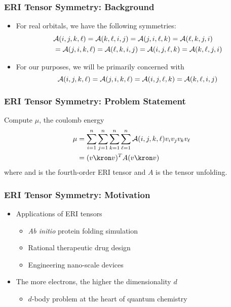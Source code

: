 \documentclass[bigger]{beamer}
\begin{document}
\begin{frame}
\frametitle{ERI Tensor Symmetry: Background}
\label{sec-1-3}
\begin{itemize}

\item For real orbitals, we have the following symmetries:
\label{sec-1-3-1}%
\begin{align*}
&{\cal A}(i,j,k,\ell) = {\cal A}(k,\ell,i,j) = {\cal A}(j,i,\ell,k) = {\cal A}(\ell,k,j,i)\\
&={\cal A}(j,i,k,\ell) = {\cal A}(\ell,k,i,j) = {\cal A}(i,j,\ell,k) = {\cal A}(k,\ell,j,i)
\end{align*}

\item For our purposes, we will be primarily concerned with
\label{sec-1-3-2}%
\begin{equation*}
{\cal A}(i,j,k,\ell) = {\cal A}(j,i,k,\ell) = {\cal A}(i,j,\ell,k) = {\cal A}(k,\ell,i,j)
\end{equation*}
\end{itemize} %
\end{frame}
\begin{frame}
\frametitle{ERI Tensor Symmetry: Problem Statement}
\label{sec-1-4}

Compute $\mu$, the coulomb energy
\begin{align*}
\mu &= \sum_{i=1}^{n}  \sum_{j=1}^{n}  \sum_{k=1}^{n}  \sum_{\ell=1}^{n}
{\cal A}(i,j,k,\ell) v_{i}v_{j}v_{k}v_{\ell}\\
&= (v\kron v)^{T} A (v \kron v)
\end{align*}
where  and  is the fourth-order ERI tensor and $A$ is the tensor unfolding.
\end{frame}
\begin{frame}
\frametitle{ERI Tensor Symmetry: Motivation}
\label{sec-1-5}
\begin{itemize}

\item Applications of ERI tensors
\label{sec-1-5-1}%
\begin{itemize}

\item \emph{Ab initio} protein folding simulation
\label{sec-1-5-1-1}%

\item Rational therapeutic drug design
\label{sec-1-5-1-2}%

\item Engineering nano-scale devices
\label{sec-1-5-1-3}%
\end{itemize} %

\item The more electrons, the higher the dimensionality $d$
\label{sec-1-5-2}%
\begin{itemize}

\item $d$-body problem at the heart of quantum chemistry
\label{sec-1-5-2-1}%
\end{itemize} %
\end{itemize} %
\end{frame}
\end{document}
